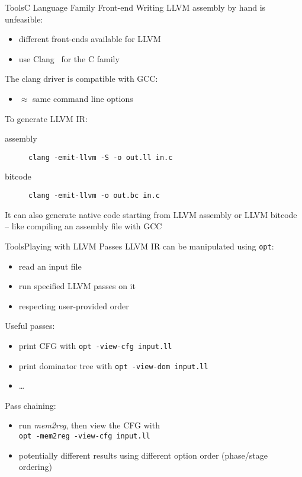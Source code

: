 \documentclass[10pt,mathserif]{beamer}
\begin{document}
\begin{frame}{Tools}{C Language Family Front-end}
Writing LLVM assembly by hand is unfeasible:

\begin{itemize}
\item different front-ends available for LLVM
\item use Clang~\cite{LOCAL:www/clang} for the C family
\end{itemize}

The clang driver is compatible with GCC:

\begin{itemize}
\item $\approx$ same command line options
\end{itemize}

\vfill
To generate LLVM IR:

\begin{description}
\item[assembly] \texttt{\smaller clang -emit-llvm -S -o out.ll in.c}
\item[bitcode] \texttt{\smaller  clang -emit-llvm -o out.bc in.c}
\end{description}

It can also generate native code starting from LLVM assembly or LLVM bitcode --
like compiling an assembly file with GCC
\end{frame}

\begin{frame}{Tools}{Playing with LLVM Passes}
LLVM IR can be manipulated using \texttt{\smaller opt}:

\begin{itemize}
\item read an input file
\item run specified LLVM passes on it
\item respecting user-provided order
\end{itemize}

\vfill
Useful passes:

\begin{itemize}
\item print CFG with \texttt{\smaller opt -view-cfg input.ll}
\item print dominator tree with \texttt{\smaller opt -view-dom input.ll}
\item \ldots
\end{itemize}

Pass chaining:

\begin{itemize}
\item run \emph{mem2reg}, then view the CFG with \\
\texttt{\smaller opt -mem2reg -view-cfg input.ll}
\item potentially different results using different option order (\alert{phase/stage ordering})
\end{itemize}
\end{frame}
\end{document}
